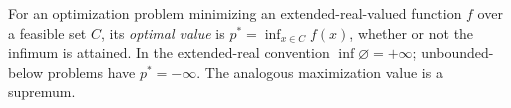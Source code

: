 
For an optimization problem minimizing an extended-real-valued function $f$ over a feasible set $C$, its \emph{optimal value} is $p^*=\inf_{x\in C}f(x)$, whether or not the infimum is attained. In the extended-real convention $\inf\varnothing=+\infty$; unbounded-below problems have $p^*=-\infty$. The analogous maximization value is a supremum.
